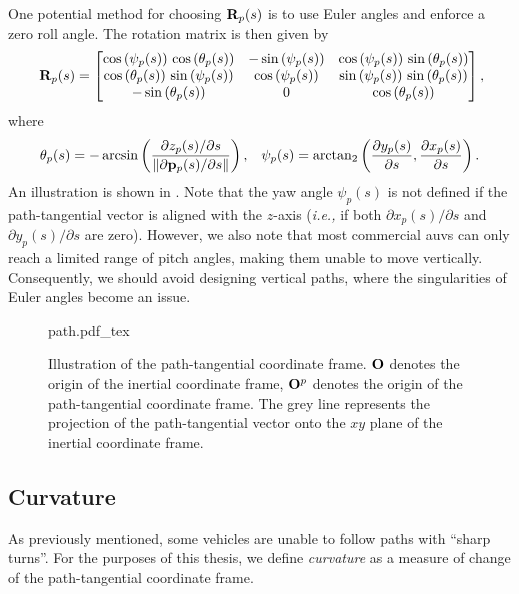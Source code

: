 One potential method for choosing $\mathbf{R}_p(s)$ is to use Euler angles and enforce a zero roll angle.
The rotation matrix is then given by
\begin{equation}
    \mat{R}_p(s) =
    \begin{bmatrix}
         \cos\left(\psi_{p}(s)\right)\,\cos\left(\theta_{p}(s)\right) & -\sin\left(\psi_{p}(s)\right) & \cos\left(\psi_{p}(s)\right)\,\sin\left(\theta_{p}(s)\right) \\ \cos\left(\theta_{p}(s)\right)\,\sin\left(\psi_{p}(s)\right) & \cos\left(\psi_{p}(s)\right) & \sin\left(\psi_{p}(s)\right)\,\sin\left(\theta_{p}(s)\right) \\ -\sin\left(\theta_{p}(s)\right) & 0 & \cos\left(\theta_{p}(s)\right)
    \end{bmatrix}\mathrlap{,}
    \label{eq:background_R_p_zero_roll}
\end{equation}
where
\begin{align}
    \theta_{p}(s) &= - \arcsin\left(\frac{\partial z_p(s) / \partial s}{\left\|\partial \mathbf{p}_p(s) / \partial s\right\|}\right), &
    \psi_{p}(s) = \mathrm{arctan}_{2}\left(\frac{\partial  y_{p}(s)}{\partial s}, \frac{\partial  x_{p}(s)}{\partial s}\right).
\end{align}
An illustration is shown in .
Note that the yaw angle $\psi_{p}(s)$ is not defined if the path-tangential vector is aligned with the $z$-axis (\emph{i.e.,} if both $\partial x_p(s) / \partial s$ and $\partial y_p(s) / \partial s$ are zero).
However, we also note that most commercial \glspl{auv} can only reach a limited range of pitch angles, making them unable to move vertically.
Consequently, we should avoid designing vertical paths, where the singularities of Euler angles become an issue.

\begin{figure}[t]
    \centering
    \def\svgwidth{0.6\textwidth}
    {path.pdf_tex}
    \vspace*{-1em}
    \caption{Illustration of the path-tangential coordinate frame. $\mathbf{O}$ denotes the origin of the inertial coordinate frame, $\mathbf{O}^p$ denotes the origin of the path-tangential coordinate frame. The grey line represents the projection of the path-tangential vector onto the $xy$ plane of the inertial coordinate frame.}
    \label{fig:background_path}
\end{figure}

\subsection{Curvature}
As previously mentioned, some vehicles are unable to follow paths with ``sharp turns''.
For the purposes of this thesis, we define \emph{curvature} as a measure of change of the path-tangential coordinate frame.

